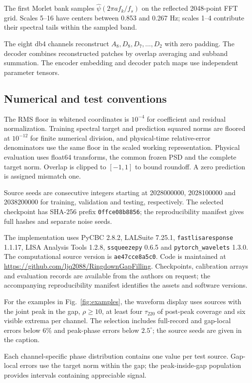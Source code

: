 \documentclass[10pt,prd,aps,a4paper,twocolumn,superscriptaddress,nofootinbib,floatfix]{revtex4-2}
\begin{document}
The first Morlet bank samples $\widehat\psi(2\pi a f_k/f_s)$ on the reflected 2048-point FFT grid. Scales 5--16 have centers between 0.853 and 0.267 Hz; scales 1--4 contribute their spectral tails within the sampled band.

The eight db4 channels reconstruct $A_8,D_8,D_7,\ldots,D_2$ with zero padding. The decoder combines reconstructed patches by overlap averaging and subband summation. The encoder embedding and decoder patch maps use independent parameter tensors.

\subsection{Numerical and test conventions}
The RMS floor in whitened coordinates is $10^{-4}$ for coefficient and residual normalization. Training spectral target and prediction squared norms are floored at $10^{-12}$ for finite numerical division, and physical-time relative-error denominators use the same floor in the scaled working representation. Physical evaluation uses float64 transforms, the common frozen PSD and the complete target norm. Overlap is clipped to $[-1,1]$ to bound roundoff. A zero prediction is assigned mismatch one.

Source seeds are consecutive integers starting at 2028000000, 2028100000 and 2038200000 for training, validation and testing, respectively. The selected checkpoint has SHA-256 prefix \texttt{0ffce08b8856}; the reproducibility manifest gives full hashes and separate noise seeds.

The implementation uses PyCBC 2.8.2, LALSuite 7.25.1, \texttt{fastlisaresponse} 1.1.17, LISA Analysis Tools 1.2.8, \texttt{ssqueezepy} 0.6.5 and \texttt{pytorch\_wavelets} 1.3.0. The computational source version is \texttt{ae47cce8a5c0}. Code is maintained at \url{https://github.com/ljq2088/RingdownGapFilling}. Checkpoints, calibration arrays and evaluation records are available from the authors on request; the accompanying reproducibility manifest identifies the assets and software versions.

For the examples in Fig.~\ref{fig:examples}, the waveform display uses sources with the joint peak in the gap, $\rho\ge10$, at least four $\tau_{220}$ of post-peak coverage and six visible extrema per channel. The selection includes full-record and gap-local errors below 6\% and peak-phase errors below $2.5^\circ$; the source seeds are given in the caption.

Each channel-specific phase distribution contains one value per test source. Gap-local errors use the target norm within the gap; the peak-inside-gap population provides intervals containing appreciable signal.
\end{document}
